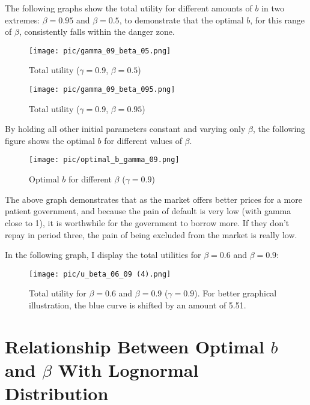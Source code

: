 \documentclass{article}
\begin{document}
The following graphs show the total utility for different amounts of $b$ in two extremes: $\beta = 0.95$ and $\beta = 0.5$, to demonstrate that the optimal $b$, for this range of $\beta$, consistently falls within the danger zone.

\begin{figure}[H]
    \centering
    \begin{minipage}{0.5\textwidth}
        \centering
        \texttt{[image: pic/gamma\_09\_beta\_05.png]}
        \caption{Total utility ($\gamma = 0.9$, $\beta = 0.5$)}
        \label{fig:gamma05beta05}
    \end{minipage}\hfill
    \begin{minipage}{0.5\textwidth}
        \centering
        \texttt{[image: pic/gamma\_09\_beta\_095.png]}
        \caption{Total utility ($\gamma = 0.9$, $\beta = 0.95$)}
        \label{fig:gamma05beta095}
    \end{minipage}
\end{figure}

By holding all other initial parameters constant and varying only $\beta$, the following figure shows the optimal $b$ for 
different values of $\beta$.

\begin{figure}[H]
\centering
{\texttt{[image: pic/optimal\_b\_gamma\_09.png]}}
\caption{Optimal $b$ for different $\beta$ ($\gamma = 0.9$)}
\end{figure}

The above graph demonstrates that as the market offers better prices for a more patient government, and because the pain of default is very low (with gamma close to 1), it is worthwhile for the government to borrow more. If they don't repay in period three, the pain of being excluded from the market is really low.

In the following graph, I display the total utilities for $\beta = 0.6$ and $\beta = 0.9$:

\begin{figure}[H]
\centering
{\texttt{[image: pic/u\_beta\_06\_09 (4).png]}}
\caption{Total utility for $\beta = 0.6$ and $\beta = 0.9$ ($\gamma =0.9$). For better graphical illustration, the blue curve is shifted by an amount of 5.51.}
\end{figure}

\section{Relationship Between Optimal $b$ and $\beta$ With Lognormal Distribution}
\end{document}
